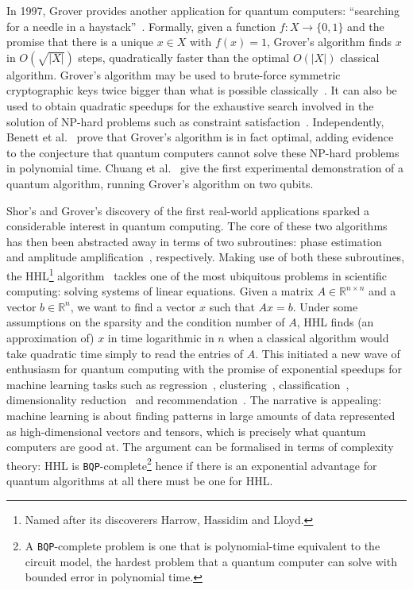 In 1997, Grover provides another application for quantum computers: ``searching for a needle in a haystack''~\cite{Grover97}.
Formally, given a function $f : X \to \{0, 1\}$ and the promise that there is a unique $x \in X$ with $f(x) = 1$, Grover's algorithm finds $x$ in $O(\sqrt{|X|})$ steps, quadratically faster than the optimal $O(|X|)$ classical algorithm.
Grover's algorithm may be used to brute-force symmetric cryptographic keys twice bigger than what is possible classically~\cite{BernsteinEtAl09}.
It can also be used to obtain quadratic speedups for the exhaustive search involved in the solution of NP-hard problems such as constraint satisfaction~\cite{Ambainis04}.
Independently, Benett et al.~\cite{BennettEtAl97} prove that Grover's algorithm is in fact optimal, adding evidence to the conjecture that quantum computers cannot solve these NP-hard problems in polynomial time.
Chuang et al.~\cite{ChuangEtAl98} give the first experimental demonstration of a quantum algorithm, running Grover's algorithm on two qubits.

Shor's and Grover's discovery of the first real-world applications sparked a considerable interest in quantum computing.
The core of these two algorithms has then been abstracted away in terms of two
subroutines: phase estimation~\cite{Kitaev95} and amplitude
amplification~\cite{BrassardEtAl02}, respectively.
Making use of both these subroutines, the HHL\footnote{Named after its discoverers Harrow, Hassidim and Lloyd.} algorithm~\cite{HarrowEtAl09} tackles one of the most ubiquitous problems in scientific computing: solving systems of linear equations.
Given a matrix $A \in \mathbb{R}^{n \times n}$ and a vector ${b} \in \mathbb{R}^{n}$, we want to find a vector ${x}$ such that $A {x} = {b}$.
Under some assumptions on the sparsity and the condition number of $A$, HHL finds (an approximation of) $x$ in time logarithmic in $n$ when a classical algorithm would take quadratic time simply to read the entries of $A$.
This initiated a new wave of enthusiasm for quantum computing with the promise of exponential speedups for machine learning tasks such as regression~\cite{WiebeEtAl12}, clustering~\cite{LloydEtAl13}, classification~\cite{RebentrostEtAl14}, dimensionality reduction~\cite{LloydEtAl14} and recommendation~\cite{KerenidisPrakash16}.
The narrative is appealing: machine learning is about finding patterns in large amounts of data represented as high-dimensional vectors and tensors, which is precisely what quantum computers are good at.
The argument can be formalised in terms of complexity theory: HHL is \texttt{BQP}-complete\footnote
{A \texttt{BQP}-complete problem is one that is polynomial-time  equivalent to the circuit model, the hardest problem that a quantum computer can solve with bounded error in polynomial time.}
hence if there is an exponential advantage for quantum algorithms at all there must be one for HHL.

